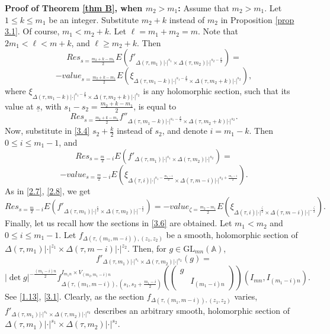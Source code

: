 \documentclass[12pts]{amsart}
\newcommand{\BA}{{\mathbb {A}}}
\newcommand{\GL}{{\mathrm{GL}}}
\begin{document}
    
    {\bf Proof of Theorem \ref{thm B}, when $m_2> m_1$:} Assume that $m_2> m_1$. Let $1\leq k\leq m_1$ be an integer. Substitute $m_2+k$ instead of $m_2$ in Proposition \ref{prop 3.1}. Of course, $m_1<m_2+k$. Let $\ell=m_1+m_2=m$. Note that $2m_1<\ell<m+k$, and $\ell\geq m_2+k$. Then
    \begin{equation}\label{3.4}
    	Res_{s=\frac{m_2+k-m_1}{2}}E(f'_{\Delta(\tau,m_1)|\cdot|^{s_1}\times \Delta(\tau,m_2)|\cdot|^{s_2-\frac{k}{2}}})=
    \end{equation}
    $$
    -value_{s=\frac{m_2+k-m_1}{2}}E(\xi_{\Delta(\tau,m_1-k)|\cdot|^{s_1-\frac{k}{2}}\times \Delta(\tau,m_2+k)|\cdot|^{s_2}}),
    $$
    where $\xi_{\Delta(\tau,m_1-k)|\cdot|^{s_1-\frac{k}{2}}\times \Delta(\tau,m_2+k)|\cdot|^{s_2}}$ is any holomorphic section, such that its value at $\underline{s}$, with $s_1-s_2=\frac{m_2+k-m_1}{2}$, is equal to 
    $$
    Res_{s=\frac{m_2+k-m_1}{2}}f''_{\Delta(\tau,m_1-k)|\cdot|^{s_1-\frac{k}{2}}\times \Delta(\tau,m_2+k)|\cdot|^{s_2}}.
    $$
    Now, substitute in \eqref{3.4} $s_2+\frac{k}{2}$ instead of $s_2$, and denote $i=m_1-k$. Then $0\leq i\leq m_1-1$, and
\begin{equation}\label{3.5}
	Res_{s=\frac{m}{2}-i}E(f'_{\Delta(\tau,m_1)|\cdot|^{s_1}\times \Delta(\tau,m_2)|\cdot|^{s_2}})=
\end{equation}
$$
-value_{s=\frac{m}{2}-i}E(\xi_{\Delta(\tau,i)|\cdot|^{s_1-\frac{m_1-i}{2}}\times \Delta(\tau,m-i)|\cdot|^{s_2+\frac{m_1-i}{2}}}).
$$
As in \eqref{2.7}, \eqref{2.8}, we get
\begin{equation}\label{3.6}
Res_{s=\frac{m}{2}-i}E(f'_{\Delta(\tau,m_1)|\cdot|^{\frac{s}{2}}\times \Delta(\tau,m_2)|\cdot|^{-\frac{s}{2}}})=-value_{\zeta=\frac{m_2-m_1}{2}}E(\xi_{\Delta(\tau,i)|\cdot|^{\frac{\zeta}{2}}\times \Delta(\tau,m-i)|\cdot|^{-\frac{\zeta}{2}}}).
	\end{equation}
Finally, let us recall how the sections in \eqref{3.6} are obtained. Let $m_1<m_2$ and $0\leq i\leq m_1-1$.	Let $f_{\Delta(\tau,(m_1,m-i)),(z_1,z_2)}$ be a smooth, holomorphic section of $\Delta(\tau,m_1)|\cdot|^{z_1}\times \Delta(\tau,m-i)|\cdot|^{z_2}$. Then, for $g\in \GL_{mn}(\BA)$, 
\begin{equation}\label{3.7}
	f'_{\Delta(\tau,m_1)|\cdot|^{s_1}\times \Delta(\tau,m_2)|\cdot|^{s_2}}(g)=
\end{equation}
$$
|\det g|^{-\frac{(m_1-i) n}{2}}f^{I_{m_1n}\times V_{(m_2,m_1-i)n}}_{\Delta(\tau,(m_1,m-i)),(s_1,s_2+\frac{m_1-i}{2})}(\begin{pmatrix}g\\&I_{(m_1-i)n}\end{pmatrix})(I_{mn},I_{(m_1-i)n}).
$$
See \eqref{1.13}, \eqref{3.1}. Clearly, as the section $f_{\Delta(\tau,(m_1,m-i)),(z_1,z_2)}$ varies,\\ $f'_{\Delta(\tau,m_1)|\cdot|^{s_1}\times \Delta(\tau,m_2)|\cdot|^{s_2}}$ describes an arbitrary smooth, holomorphic section of\\ $\Delta(\tau,m_1)|\cdot|^{s_1}\times \Delta(\tau,m_2)|\cdot|^{s_2}$.
	
\end{document}
